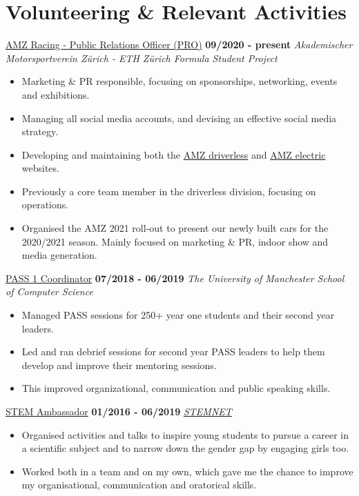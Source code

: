 \documentclass[]{friggeri-cv}
\begin{document}

\section{\color{red}Volunteering \color{gray} \& Relevant Activities}
\entry
    {}
    {\href{https://driverless.amzracing.ch}{AMZ Racing - Public Relations Officer (PRO)}}
    {\textbf{09/2020 - present}}
    {\emph{Akademischer Motorsportverein Zürich - ETH Zürich Formula Student Project}}
    \begin{itemize}
        \item Marketing \& PR responsible, focusing on sponsorships,  networking, events and exhibitions.
        \item Managing all social media accounts, and devising an effective social media strategy.
        \item Developing and maintaining both the \href{https://driverless.amzracing.ch/en/home}{AMZ driverless} and \href{https://electric.amzracing.ch/en/home}{AMZ electric} websites.
        \item Previously a core team member in the driverless division, focusing on operations.
        \item Organised the AMZ 2021 roll-out to present our newly built cars for the 2020/2021 season. Mainly focused on marketing \& PR, indoor show and media generation.\\
    \end{itemize}
\entry
    {}
    {\href{http://www.pass.manchester.ac.uk/}{PASS 1 Coordinator}}
    {\textbf{07/2018 - 06/2019}}
    {\emph{The University of Manchester School of Computer Science}}
    \begin{itemize}
        \item Managed PASS sessions for 250+ year one students and their second year leaders.
        \item Led and ran debrief sessions for second year PASS leaders to help them develop and improve their mentoring sessions.
        \item This improved organizational, communication and public speaking skills.\\
    \end{itemize}
\entry
    {}
    {\href{http://www.stemnet.org.uk/ambassadors/}{STEM Ambassador}}
    {\textbf{01/2016 - 06/2019}}
    {\emph{\href{http://www.stemnet.org.uk/}{STEMNET}}}
    \begin{itemize}
        \item Organised activities and talks to inspire young students to pursue a career in a scientific subject and to narrow down the gender gap by engaging girls too.
        \item Worked both in a team and on my own, which gave me the chance to improve my organisational, communication and oratorical skills.\\
    \end{itemize}
\end{document}
